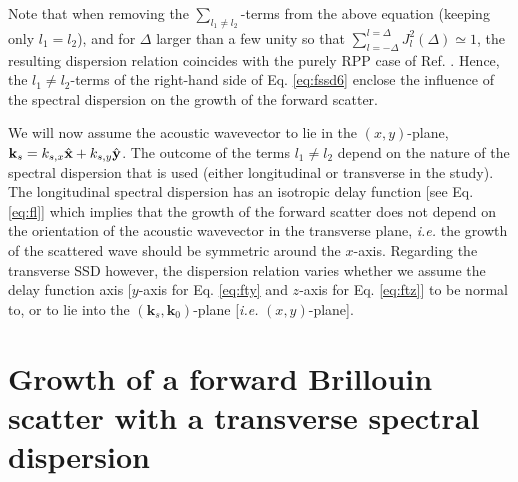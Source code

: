 \documentclass[
 reprint,
 amsmath,amssymb,
 aps,
]{revtex4-1}
\begin{document}
\begin{widetext}
Note that when removing the $\sum_{l_1\neq l_2}$-terms from the above equation (keeping only $l_1=l_2$), and for $\Delta$ larger than a few unity so that $\sum_{l=-\Delta}^{l=\Delta}J_l^2(\Delta) \simeq 1$, the resulting dispersion relation coincides with the purely RPP case of Ref. \cite[]{POP_Ruyer_2021}. Hence, the $l_1\neq l_2$-terms of the right-hand side of Eq. \eqref{eq:fssd6} enclose the influence of the spectral dispersion on the growth of the forward scatter. 

We will now assume the acoustic wavevector to lie in the $(x,y)$-plane, $\mathbf{k}_s = k_{s,x}\Hat{\mathbf{x}} +k_{s,y}\Hat{\mathbf{y}}$.
The outcome of the  terms $l_1\neq l_2$ depend on the nature of the spectral dispersion that is used (either longitudinal or transverse in the study). The longitudinal spectral dispersion has  an isotropic  delay function [see Eq. \eqref{eq:fl}] which implies that the growth of the forward scatter does not depend on the orientation of the acoustic wavevector in the transverse plane, \emph{i.e.} the growth of the scattered wave should be symmetric around the $x$-axis.  
Regarding the transverse SSD however, the dispersion relation varies whether we assume the  delay function axis [$y$-axis for  Eq. \eqref{eq:fty} and $z$-axis for  Eq. \eqref{eq:ftz}] to be normal to, or to lie into the $(\mathbf{k}_s,\mathbf{k}_0)$-plane [\emph{i.e.} $(x,y)$-plane].  

\section{Growth of a forward Brillouin scatter with a transverse spectral dispersion}

\end{widetext}
\end{document}
